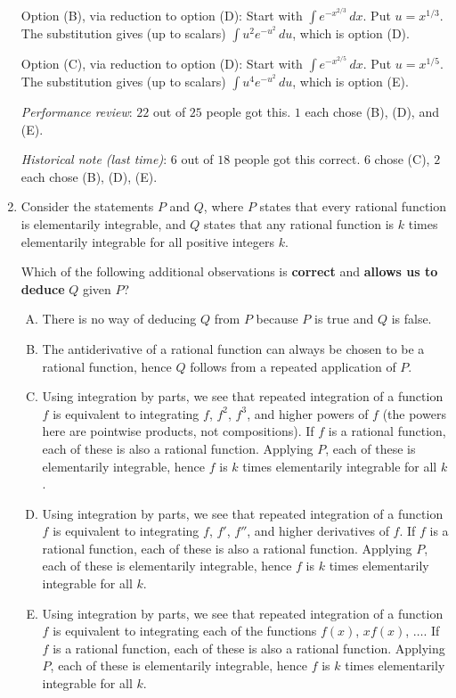 \documentclass[10pt]{amsart}
\begin{document}
\begin{enumerate}
  Option (B), via reduction to option (D): Start with $\int
  e^{-x^{2/3}} \, dx$. Put $u = x^{1/3}$. The substitution gives (up to
  scalars) $\int u^2e^{-u^2} \, du$, which is option (D).

  Option (C), via reduction to option (D): Start with $\int
  e^{-x^{2/5}} \, dx$. Put $u = x^{1/5}$. The substitution gives (up to
  scalars) $\int u^4e^{-u^2} \, du$, which is option (E).

  {\em Performance review}: $22$ out of $25$ people got this. $1$ each
  chose (B), (D), and (E).

  {\em Historical note (last time)}: $6$ out of $18$ people got this
  correct. $6$ chose (C), $2$ each chose (B), (D), (E).


\item Consider the statements $P$ and $Q$, where $P$ states that every
  rational function is elementarily integrable, and $Q$ states that
  any rational function is $k$ times elementarily integrable for all
  positive integers $k$.

  Which of the following additional observations is {\bf correct} and
  {\bf allows us to deduce} $Q$ given $P$?

  \begin{enumerate}[(A)]
  \item There is no way of deducing $Q$ from $P$ because $P$ is true
    and $Q$ is false.
  \item The antiderivative of a rational function can always be chosen
    to be a rational function, hence $Q$ follows from a repeated
    application of $P$.
  \item Using integration by parts, we see that repeated integration
    of a function $f$ is equivalent to integrating $f$, $f^2$, $f^3$,
    and higher powers of $f$ (the powers here are pointwise products,
    not compositions). If $f$ is a rational function, each of these is
    also a rational function. Applying $P$, each of these is
    elementarily integrable, hence $f$ is $k$ times elementarily
    integrable for all $k$.
  \item Using integration by parts, we see that repeated integration
    of a function $f$ is equivalent to integrating $f$, $f'$, $f''$,
    and higher derivatives of $f$. If $f$ is a rational function, each
    of these is also a rational function. Applying $P$, each of these
    is elementarily integrable, hence $f$ is $k$ times elementarily
    integrable for all $k$.
  \item Using integration by parts, we see that repeated integration
    of a function $f$ is equivalent to integrating each of the
    functions $f(x)$, $xf(x)$, $\dots$. If $f$ is a rational function,
    each of these is also a rational function. Applying $P$, each of
    these is elementarily integrable, hence $f$ is $k$ times
    elementarily integrable for all $k$.
  \end{enumerate}


\end{enumerate}
\end{document}
